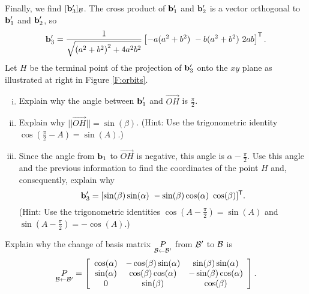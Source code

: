 \begin{pactivity}
\begin{enumerate}[i.]
	\end{enumerate}

	\item Finally, we find $[\mathbf{b}'_3]_{\mathcal{B}}$. The cross product of $\mathbf{b}'_1$ and $\mathbf{b}'_2$ is a vector orthogonal to $\mathbf{b}'_1$ and $\mathbf{b}'_2$, so 
\[\vb'_3 = \frac{1}{\sqrt{\left(a^2+b^2\right)^2+4a^2b^2}} \left[-a(a^2+b^2) \ -b(a^2+b^2) \ 2ab \right]^{\tr}.\]
Let $H$ be the terminal point of the projection of $\mathbf{b}'_3$ onto the $xy$ plane as illustrated at right in Figure \ref{F:orbits}. 
	\begin{enumerate}[i.]
	\item Explain why the angle between $\mathbf{b}'_1$ and $\overrightarrow{OH}$ is $\frac{\pi}{2}$. 
	

	\item Explain why $||\overrightarrow{OH}|| = \sin(\beta)$. (Hint: Use the trigonometric identity $\cos\left(\frac{\pi}{2}-A \right) = \sin(A)$.)
	
	\item Since the angle from $\mathbf{b}_1$ to $\overrightarrow{OH}$ is negative, this angle is $\alpha-\frac{\pi}{2}$. Use this angle and the previous information to find the coordinates of the point $H$ and, consequently, explain why 
\[\vb'_3  = [ \sin(\beta)\sin(\alpha) \ -\sin(\beta)\cos(\alpha) \ \cos(\beta)]^{\tr}.\]
(Hint: Use the trigonometric identities $\cos\left(A - \frac{\pi}{2} \right) = \sin(A)$ and $\sin\left(A - \frac{\pi}{2}\right) = -\cos(A)$.)

	\end{enumerate}
	
\item Explain why the change of basis matrix $\underset{\mathcal{B} \leftarrow \mathcal{B}'}{P}$ from $\mathcal{B}'$ to $\mathcal{B}$ is 
\[\underset{\mathcal{B} \leftarrow \mathcal{B}'}{P} = \left[ \begin{array}{ccc} 
\cos(\alpha)&-\cos(\beta)\sin(\alpha)&\sin(\beta)\sin(\alpha) \\ 
\sin(\alpha)&\cos(\beta)\cos(\alpha)&-\sin(\beta)\cos(\alpha) \\ 
0&\sin(\beta)&\cos(\beta) \end{array} \right].\]

	\ea
	
\end{pactivity}

